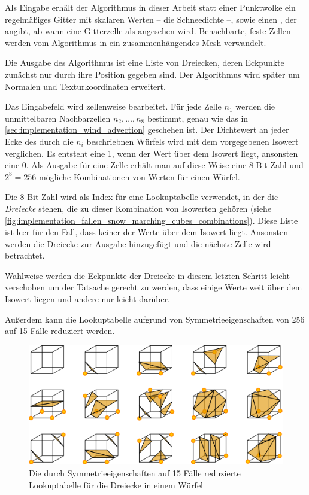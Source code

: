 Als Eingabe erhält der Algorithmus in dieser Arbeit statt einer
Punktwolke ein regelmäßiges Gitter mit skalaren Werten -- \PimiddyzB
die Schneedichte --, sowie einen , der angibt,
ab wann eine Gitterzelle als  angesehen wird.
Benachbarte, feste Zellen werden vom Algorithmus in ein
zusammenhängendes Mesh verwandelt.

Die Ausgabe des Algorithmus ist eine Liste von Dreiecken, deren
Eckpunkte zunächst nur durch ihre Position gegeben sind. Der
Algorithmus wird später um Normalen und Texturkoordinaten erweitert.

Das Eingabefeld wird zellenweise bearbeitet. Für jede Zelle $n_1$
werden die unmittelbaren Nachbarzellen $n_2,\ldots,n_8$ bestimmt,
genau wie das in \autoref{sec:implementation_wind_advection} geschehen
ist. Der Dichtewert an jeder Ecke des durch die $n_i$ beschriebnen
Würfels wird mit dem vorgegebenen Isowert verglichen. Es entsteht eine
1, wenn der Wert über dem Isowert liegt, ansonsten eine 0. Als Ausgabe
für eine Zelle erhält man auf diese Weise eine 8-Bit-Zahl und
$2^8=256$ mögliche Kombinationen von Werten für einen Würfel.

Die 8-Bit-Zahl wird als Index für eine Lookuptabelle verwendet, in der
die \emph{Dreiecke} stehen, die zu dieser Kombination von Isowerten
gehören (siehe
\autoref{fig:implementation_fallen_snow_marching_cubes_combinations}). Diese
Liste ist leer für den Fall, dass keiner der Werte über dem Isowert
liegt. Ansonsten werden die Dreiecke zur Ausgabe hinzugefügt und die
nächste Zelle wird betrachtet.

Wahlweise werden die Eckpunkte der Dreiecke in diesem letzten Schritt
leicht verschoben um der Tatsache gerecht zu werden, dass einige Werte
\Pimiddyggf weit über dem Isowert liegen und andere nur leicht
darüber.

Außerdem kann die Lookuptabelle aufgrund von Symmetrieeigenschaften
von 256 auf 15 Fälle reduziert werden.

\begin{figure}[h]
\centering
\includegraphics[width=12cm]{images/marching_cubes_combinations}
\caption{Die durch Symmetrieeigenschaften auf 15 Fälle reduzierte Lookuptabelle für die Dreiecke in einem Würfel}
\label{fig:implementation_fallen_snow_marching_cubes_combinations}
\end{figure}

